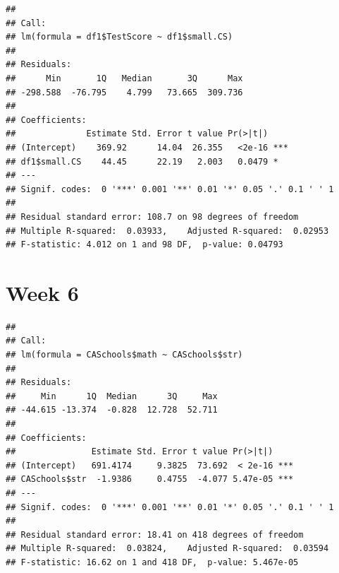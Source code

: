 \documentclass[
]{book}
\newenvironment{Shaded}{\begin{snugshade}}{\end{snugshade}}
\newcommand{\KeywordTok}[1]{\textcolor[rgb]{0.13,0.29,0.53}{\textbf{#1}}}
\newcommand{\NormalTok}[1]{#1}
\newcommand{\OperatorTok}[1]{\textcolor[rgb]{0.81,0.36,0.00}{\textbf{#1}}}
\newcommand{\StringTok}[1]{\textcolor[rgb]{0.31,0.60,0.02}{#1}}
\begin{document}
\begin{Shaded}
\end{Shaded}

\begin{verbatim}
## 
## Call:
## lm(formula = df1$TestScore ~ df1$small.CS)
## 
## Residuals:
##      Min       1Q   Median       3Q      Max 
## -298.588  -76.795    4.799   73.665  309.736 
## 
## Coefficients:
##              Estimate Std. Error t value Pr(>|t|)    
## (Intercept)    369.92      14.04  26.355   <2e-16 ***
## df1$small.CS    44.45      22.19   2.003   0.0479 *  
## ---
## Signif. codes:  0 '***' 0.001 '**' 0.01 '*' 0.05 '.' 0.1 ' ' 1
## 
## Residual standard error: 108.7 on 98 degrees of freedom
## Multiple R-squared:  0.03933,    Adjusted R-squared:  0.02953 
## F-statistic: 4.012 on 1 and 98 DF,  p-value: 0.04793
\end{verbatim}

\hypertarget{week-6}{%
\section{Week 6}\label{week-6}}

\begin{Shaded}
\end{Shaded}

\begin{verbatim}
## 
## Call:
## lm(formula = CASchools$math ~ CASchools$str)
## 
## Residuals:
##     Min      1Q  Median      3Q     Max 
## -44.615 -13.374  -0.828  12.728  52.711 
## 
## Coefficients:
##               Estimate Std. Error t value Pr(>|t|)    
## (Intercept)   691.4174     9.3825  73.692  < 2e-16 ***
## CASchools$str  -1.9386     0.4755  -4.077 5.47e-05 ***
## ---
## Signif. codes:  0 '***' 0.001 '**' 0.01 '*' 0.05 '.' 0.1 ' ' 1
## 
## Residual standard error: 18.41 on 418 degrees of freedom
## Multiple R-squared:  0.03824,    Adjusted R-squared:  0.03594 
## F-statistic: 16.62 on 1 and 418 DF,  p-value: 5.467e-05
\end{verbatim}
\end{document}
